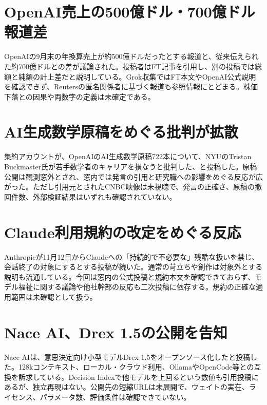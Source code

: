 \section{OpenAI売上の500億ドル・700億ドル報道差}
OpenAIの9月末の年換算売上が約500億ドルだったとする報道と、従来伝えられた約700億ドルとの差が議論された。投稿者はFT記事を引用し、別の投稿では総額と純額の計上差だと説明している。Grok収集ではFT本文やOpenAI公式説明を確認できず、Reutersの匿名関係者に基づく報道も参照情報にとどまる。株価下落との因果や両数字の定義は未確定である。

\section{AI生成数学原稿をめぐる批判が拡散}
集約アカウントが、OpenAIのAI生成数学原稿722本について、NYUのTristan Buckmaster氏が若手数学者のキャリアを損なうと批判した、と投稿した。原稿公開は観測窓外とされ、窓内では発言の引用と研究職への影響をめぐる反応が広がった。ただし引用元とされたCNBC映像は未視聴で、発言の正確さ、原稿の撤回件数、外部検証結果はいずれも確認されていない。

\section{Claude利用規約の改定をめぐる反応}
Anthropicが11月12日からClaudeへの「持続的で不必要な」残酷な扱いを禁じ、会話終了の対象にするとする投稿が続いた。通常の苛立ちや創作は対象外とする説明も流通している。今回は窓内の公式投稿と規約本文を確認できておらず、モデル福祉に関する議論や他社幹部の反応も二次投稿に依存する。規約の正確な適用範囲は未確認として扱う。

\section{Nace AI、Drex 1.5の公開を告知}
Nace AIは、意思決定向け小型モデルDrex 1.5をオープンソース化したと投稿した。128kコンテキスト、ローカル・クラウド利用、OllamaやOpenCode等との互換を訴求している。Decision Indexで他モデルを上回るという数値も引用投稿にあるが、独立再現はない。公開先の短縮URLは未展開で、ウェイトの実在、ライセンス、パラメータ数、評価条件は確認できていない。

